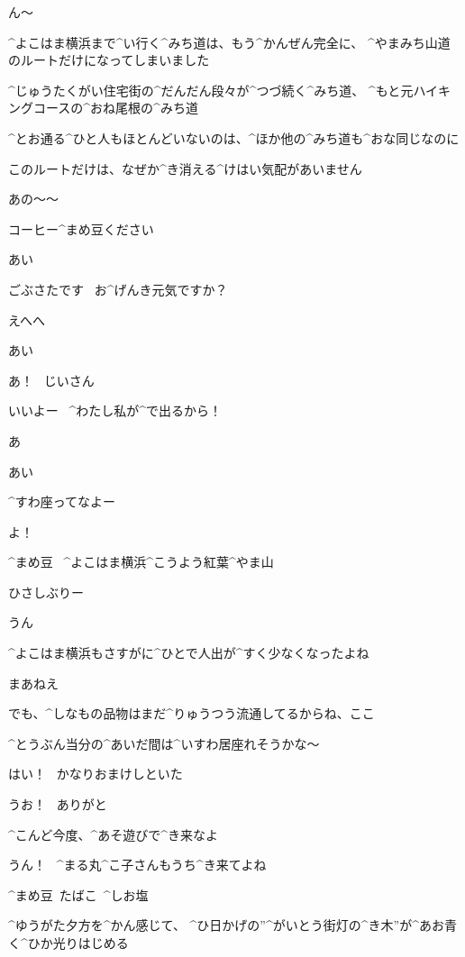 \page[141]
\Alpha ん〜

\page[142]
\Alpha ^{よこはま}{横浜}まで^{い}{行}く^{みち}{道}は、もう^{かんぜん}{完全}に、
^{やまみち}{山道}のルートだけになってしまいました

\Alpha ^{じゅうたくがい}{住宅街}の^{だんだん}{段々}が^{つづ}{続}く^{みち}{道}、
^{もと}{元}ハイキングコースの^{おね}{尾根}の^{みち}{道}

\page[143]
\Alpha ^{とお}{通}る^{ひと}{人}もほとんどいないのは、^{ほか}{他}の^{みち}{道}も^{おな}{同}じなのに

\Alpha このルートだけは、なぜか^{き}{消}える^{けはい}{気配}があいません

\page[145]
\Alpha あの〜〜

\Alpha コーヒー^{まめ}{豆}ください

\Person あい

\Alpha ごぶさたです
\ お^{げんき}{元気}ですか？

\Alpha えへへ

\Person あい

\Maruko あ！
\ じいさん

\Maruko いいよー
\ ^{わたし}{私}が^{で}{出}るから！

\Alpha あ

\Person あい

\Maruko ^{すわ}{座}ってなよー

\page[146]
\Maruko よ！

\Sign ^{まめ}{豆}
\ ^{よこはま}{横浜}^{こうよう}{紅葉}^{やま}{山}

\Maruko ひさしぶりー

\Alpha うん

\Alpha ^{よこはま}{横浜}もさすがに^{ひとで}{人出}が^{すく}{少}なくなったよね

\Maruko まあねえ

\Maruko でも、^{しなもの}{品物}はまだ^{りゅうつう}{流通}してるからね、ここ

\Maruko ^{とうぶん}{当分}の^{あいだ}{間}は^{いすわ}{居座}れそうかな〜

\Maruko はい！
\ かなりおまけしといた

\Alpha うお！
\ ありがと

\page[147]
\Maruko ^{こんど}{今度}、^{あそ}{遊}びで^{き}{来}なよ

\Alpha うん！
\ ^{まる}{丸}^{こ}{子}さんもうち^{き}{来}てよね

\Sign ^{まめ}{豆}\ たばこ\ ^{しお}{塩}

\page[148]
\Alpha ^{ゆうがた}{夕方}を^{かん}{感}じて、
^{ひ}{日}かげの”^{がいとう}{街灯}の^{き}{木}”が^{あお}{青}く^{ひか}{光}りはじめる

